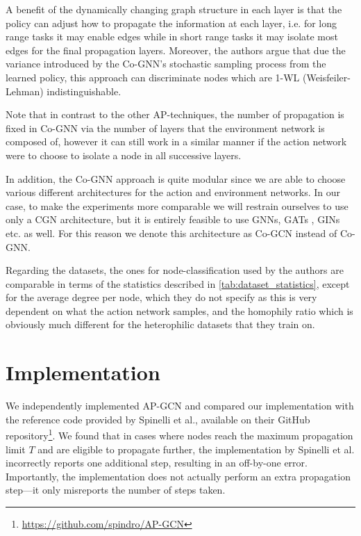 \documentclass{gdl}
\begin{document}
A benefit of the dynamically changing graph structure in each layer is that the policy can adjust how to propagate the information at each layer, i.e. for long range tasks it may enable edges while in short range tasks it may isolate most edges for the final propagation layers. Moreover, the authors argue that due the variance introduced by the Co-GNN's stochastic sampling process from the learned policy, this approach can discriminate nodes which are 1-WL (Weisfeiler-Lehman) indistinguishable.

Note that in contrast to the other AP-techniques, the number of propagation is fixed in Co-GNN via the number of layers that the environment network is composed of, however it can still work in a similar manner if the action network were to choose to isolate a node in all successive layers.

In addition, the Co-GNN approach is quite modular since we are able to choose various different architectures for the action and environment networks. In our case, to make the experiments more comparable we will restrain ourselves to use only a CGN architecture, but it is entirely feasible to use GNNs, GATs \cite{veličković2018graphattentionnetworks}, GINs \cite{xu2019powerfulgraphneuralnetworks} etc. as well. For this reason we denote this architecture as Co-GCN instead of Co-GNN.

Regarding the datasets, the ones for node-classification used by the authors are comparable in terms of the statistics described in \autoref{tab:dataset_statistics}, except for the average degree per node, which they do not specify as this is very dependent on what the action network samples, and the homophily ratio which is obviously much different for the heterophilic datasets that they train on.

\section{Implementation}
We independently implemented AP-GCN and compared our implementation with the reference code provided by Spinelli et al., available on their GitHub repository\footnote{\url{https://github.com/spindro/AP-GCN}}. We found that in cases where nodes reach the maximum propagation limit $T$ and are eligible to propagate further, the implementation by Spinelli et al. incorrectly reports one additional step, resulting in an off-by-one error. Importantly, the implementation does not actually perform an extra propagation step—it only misreports the number of steps taken.
\end{document}
